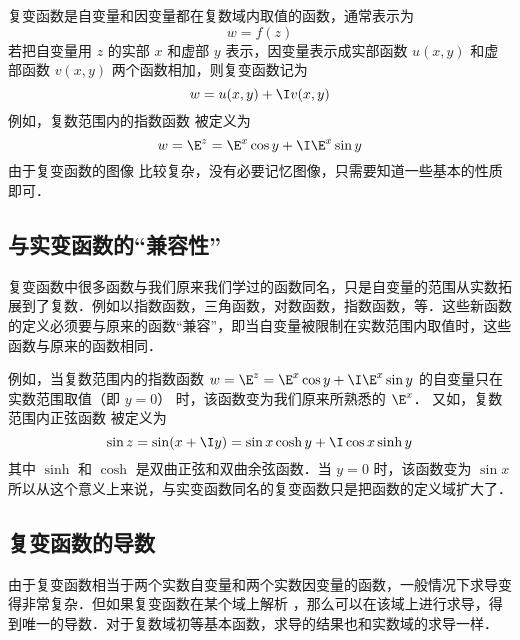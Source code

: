 
复变函数是自变量和因变量都在复数域内取值的函数，通常表示为
\begin{equation}
w = f(z)
\end{equation}
若把自变量用 $z$ 的实部 $x$ 和虚部 $y$ 表示，因变量表示成实部函数 $u(x,y)$ 和虚部函数 $v(x,y)$ 两个函数相加，则复变函数记为
\begin{equation}
w = u(x,y) + \I v(x,y)
\end{equation}
例如，复数范围内的指数函数%
被定义为
\begin{equation}
w = \E^z = \E^x \cos y + \I \E^x\sin y
\end{equation}
由于复变函数的图像%
比较复杂，没有必要记忆图像，只需要知道一些基本的性质即可．

\subsection{与实变函数的“兼容性”}
复变函数中很多函数与我们原来我们学过的函数同名，只是自变量的范围从实数拓展到了复数．例如以指数函数，三角函数，对数函数，指数函数，等．这些新函数的定义必须要与原来的函数“兼容”，即当自变量被限制在实数范围内取值时，这些函数与原来的函数相同．

例如，当复数范围内的指数函数%
 $w = \E^z = \E^x \cos y + \I \E^x \sin y$ 的自变量只在实数范围取值（即 $y = 0$） 时，该函数变为我们原来所熟悉的 $\E^x$． 
又如，复数范围内正弦函数%
被定义为
\begin{equation}
\sin z = \sin(x + \I y) = \sin x\cosh y + \I\cos x\sinh y
\end{equation}
其中 $\sinh $ 和 $\cosh $ 是双曲正弦和双曲余弦函数．当 $y = 0$ 时，该函数变为 $\sin x$ 
所以从这个意义上来说，与实变函数同名的复变函数只是把函数的定义域扩大了．

\subsection{复变函数的导数}
由于复变函数相当于两个实数自变量和两个实数因变量的函数，一般情况下求导变得非常复杂．但如果复变函数在某个域上解析%
，那么可以在该域上进行求导，得到唯一的导数．对于复数域初等基本函数，求导的结果也和实数域的求导一样．


